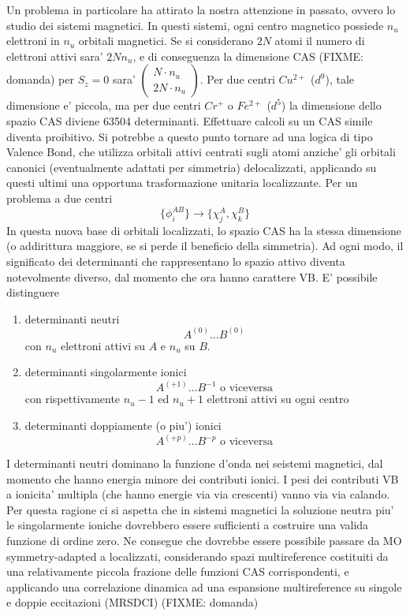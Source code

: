 Un problema in particolare ha attirato la nostra attenzione in passato,
ovvero lo studio dei sistemi magnetici.  In questi sistemi, ogni centro
magnetico possiede $n_u$ elettroni in $n_u$ orbitali magnetici. Se si
considerano $2N$ atomi il numero di elettroni attivi sara' $2 N n_u$,
e di conseguenza la dimensione CAS (FIXME: domanda) per $S_z=0$ sara' $
\left(
\begin{array}{c}
N \cdot n_u \\
2N \cdot n_u
\end{array}
\right)
$.
Per due centri $Cu^{2+}$ ($d^9$), tale dimensione e' piccola, ma
per due centri $Cr^+$ o $Fe^{2+}$ ($d^5$) la dimensione dello spazio
CAS diviene 63504 determinanti. Effettuare calcoli su un CAS simile
diventa proibitivo.  Si potrebbe a questo punto tornare ad una logica
di tipo Valence Bond, che utilizza orbitali attivi centrati sugli atomi
anziche' gli orbitali canonici (eventualmente adattati per simmetria)
delocalizzati, applicando su questi ultimi una opportuna trasformazione
unitaria localizzante.  Per un problema a due centri 
$$ 
\{\phi_i^{AB}\} \rightarrow \{\chi_j^A , \chi_k^B\} 
$$ 
In questa nuova base di orbitali localizzati, lo spazio CAS ha la
stessa dimensione (o addirittura maggiore, se si perde il beneficio
della simmetria). Ad ogni modo, il significato dei determinanti
che rappresentano lo spazio attivo diventa notevolmente diverso,
dal momento che ora hanno carattere VB. E' possibile distinguere
\begin{enumerate} 
\item determinanti neutri 
$$
A^{(0)} \ldots B^{(0)}
$$
con $n_u$ elettroni attivi su $A$ e $n_u$ su $B$.  
\item determinanti singolarmente ionici 
$$ 
A^{(+1)} \ldots B^{-1} \mbox{ o viceversa} 
$$
con rispettivamente $n_u - 1$ ed $n_u + 1$ elettroni attivi su ogni
centro \item determinanti doppiamente (o piu') ionici
$$ 
A^{(+p)} \ldots B^{-p} \mbox{ o viceversa}
$$ 
\end{enumerate}

I determinanti neutri dominano la funzione d'onda nei seistemi
magnetici, dal momento che hanno energia minore dei contributi
ionici. I pesi dei contributi VB a ionicita' multipla (che hanno
energie via via crescenti) vanno via via calando. Per questa ragione
ci si aspetta che in sistemi magnetici la soluzione neutra piu'
le singolarmente ioniche dovrebbero essere sufficienti a costruire
una valida funzione di ordine zero.  Ne consegue che dovrebbe
essere possibile passare da MO symmetry-adapted a localizzati,
considerando spazi multireference costituiti da una relativamente
piccola frazione delle funzioni CAS corrispondenti, e applicando una
correlazione dinamica ad una espansione multireference su singole e
doppie eccitazioni (MRSDCI) (FIXME: domanda)

